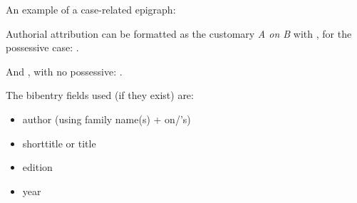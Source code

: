 \p An example of a case-related epigraph: \begin{quotation}\end{quotation}

\p {} Authorial attribution can be formatted as the customary \textit{A on B} with , for the possessive case: .

\p And , with no possessive: .

\p The bibentry fields used (if they exist) are:
\begin{itemize}
\item author (using family name(s) + on/'s)
\item shorttitle or title
\item edition
\item year
\end{itemize}
%

